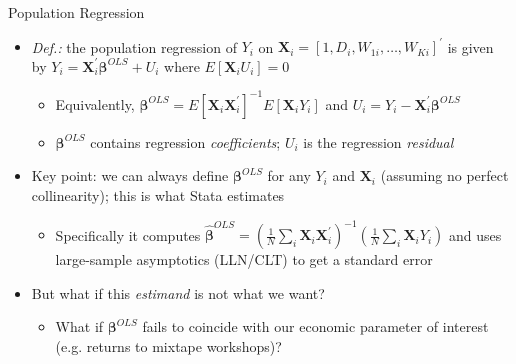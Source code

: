 \documentclass{beamer}
\begin{document}
\begin{frame}{Population Regression}
\begin{itemize}
\item \emph{Def.:} the population regression of $Y_i$ on $\mathbf{X}_i=[1,D_i,W_{1i},\dots,W_{Ki}]^\prime$ is given by $Y_i=\mathbf{X}_i^\prime\boldsymbol{\beta}^{OLS}+U_i$ where $E[\mathbf{X}_i U_i]=0$\smallskip\pause{}
\begin{itemize}
\item Equivalently, $\boldsymbol{\beta}^{OLS}=E[\mathbf{X}_i\mathbf{X}_i^\prime]^{-1}E[\mathbf{X}_iY_i]$ and $U_i=Y_i-\mathbf{X}_i^\prime\boldsymbol{\beta}^{OLS}$\smallskip
\item $\boldsymbol{\beta}^{OLS}$ contains regression \emph{coefficients}; $U_i$ is the regression \emph{residual}  
\end{itemize}\medskip\pause{}
\item Key point: we can always define $\boldsymbol{\beta}^{OLS}$ for any $Y_i$ and $\mathbf{X}_i$ (assuming no perfect collinearity); this is what Stata estimates\smallskip
\begin{itemize}
\item Specifically it computes $\widehat{\boldsymbol{\beta}}^{OLS}=(\frac{1}{N}\sum_i\mathbf{X}_i\mathbf{X}_i^\prime)^{-1}(\frac{1}{N}\sum_i\mathbf{X}_iY_i)$ and uses large-sample asymptotics (LLN/CLT) to get a standard error
\end{itemize}\pause{}\medskip
\item But what if this \emph{estimand} is not what we want? \smallskip\pause{}
\begin{itemize}
\item What if $\boldsymbol{\beta}^{OLS}$ fails to coincide with our economic parameter of interest (e.g. returns to mixtape workshops)?
\end{itemize}
\end{itemize}
\end{frame}
\end{document}
